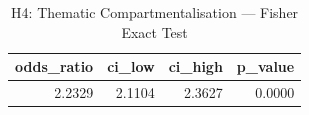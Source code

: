 \begin{table}
\caption{H4: Thematic Compartmentalisation — Fisher Exact Test}
\label{tab:h4_fisher_exact}
\begin{tabular}{rrrr}
\toprule
odds\_ratio & ci\_low & ci\_high & p\_value \\
\midrule
2.2329 & 2.1104 & 2.3627 & 0.0000 \\
\bottomrule
\end{tabular}
\end{table}
